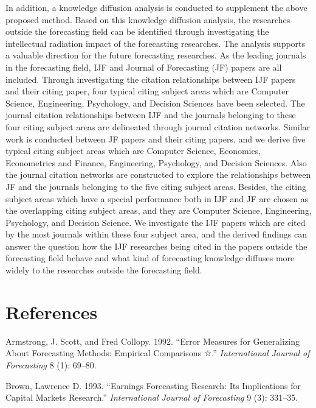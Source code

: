 \documentclass[11pt,a4paper]{elsarticle} %
\begin{document}
In addition, a knowledge diffusion analysis is conducted to supplement
the above proposed method. Based on this knowledge diffusion analysis,
the researches outside the forecasting field can be identified through
investigating the intellectual radiation impact of the forecasting
researches. The analysis supports a valuable direction for the future
forecasting researches. As the leading journals in the forecasting
field, IJF and Journal of Forecasting (JF) papers are all included.
Through investigating the citation relationships between IJF papers and
their citing paper, four typical citing subject areas which are Computer
Science, Engineering, Psychology, and Decision Sciences have been
selected. The journal citation relationships between IJF and the
journals belonging to these four citing subject areas are delineated
through journal citation networks. Similar work is conducted between JF
papers and their citing papers, and we derive five typical citing
subject areas which are Computer Science, Economics, Econometrics and
Finance, Engineering, Psychology, and Decision Sciences. Also the
journal citation networks are constructed to explore the relationships
between JF and the journals belonging to the five citing subject areas.
Besides, the citing subject areas which have a special performance both
in IJF and JF are chosen as the overlapping citing subject areas, and
they are Computer Science, Engineering, Psychology, and Decision
Science. We investigate the IJF papers which are cited by the most
journals within these four subject area, and the derived findings can
answer the question how the IJF researches being cited in the papers
outside the forecasting field behave and what kind of forecasting
knowledge diffuses more widely to the researches outside the forecasting
field.

\section*{References}\label{references}

\hypertarget{refs}{}
\hypertarget{ref-Armstrong1992}{}
Armstrong, J. Scott, and Fred Collopy. 1992. ``Error Measures for
Generalizing About Forecasting Methods: Empirical Comparisons ☆.''
\emph{International Journal of Forecasting} 8 (1): 69--80.

\hypertarget{ref-Brown1993}{}
Brown, Lawrence D. 1993. ``Earnings Forecasting Research: Its
Implications for Capital Markets Research.'' \emph{International Journal
of Forecasting} 9 (3): 331--35.
\end{document}
